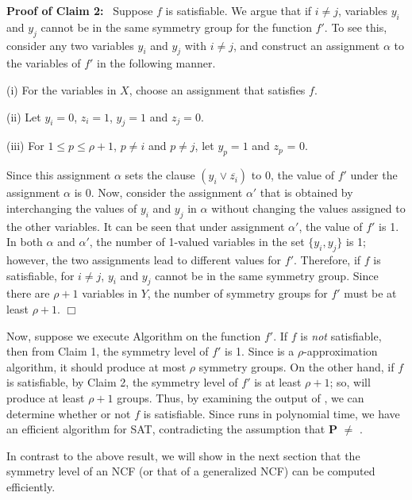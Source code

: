 \noindent
\textbf{Proof of Claim 2:}~ Suppose $f$ is satisfiable.
We argue that if $i \neq j$, variables $y_i$ and $y_j$
cannot be in the same symmetry group for the function $f'$.
To see this, consider any two variables $y_i$ and $y_j$ with $i \neq j$,
and construct an assignment $\alpha$ to
the variables of $f'$ in the following manner.
\begin{description}
\item{(i)} For the variables in $X$, choose an assignment that
satisfies $f$.
\item{(ii)} Let $y_i = 0$, $z_i = 1$, $y_j = 1$ and $z_j = 0$.
\item{(iii)} For $1 \leq p \leq \rho+1$, $p \neq i$ and $p \neq j$,
let $y_p = 1$ and $z_p$ = 0.
\end{description}
Since this assignment $\alpha$ sets the clause $(y_i \vee \overline{z_i})$ to 0,
the value of $f'$ under the assignment $\alpha$ is 0.
Now, consider the assignment $\alpha'$ that is obtained by interchanging
the values of $y_i$ and $y_j$ in $\alpha$ without changing the
values assigned to the other variables. 
It can be seen that under assignment $\alpha'$, the value of $f'$ is 1.
In both $\alpha$ and $\alpha'$, the number of 1-valued variables in 
the set $\{y_i, y_j\}$ is 1; however, the two assignments lead to 
different values for $f'$.
Therefore, if $f$ is satisfiable, for $i \neq j$, $y_i$ and $y_j$ cannot
be in the same symmetry group.
Since there are $\rho+1$ variables in $Y$, the number of symmetry groups 
for $f'$ must be at least $\rho+1$. \hfill$\Box$

\medskip
 
Now, suppose we execute Algorithm \cala{} on the function $f'$.
If $f$ is \emph{not} satisfiable, then from Claim 1, 
the symmetry level of $f'$ is 1. 
Since \cala{} is a $\rho$-approximation algorithm,
it should produce at most $\rho$ symmetry groups.
On the other hand, if $f$ is satisfiable, by Claim 2, the symmetry
level of $f'$ is at least $\rho+1$; so, \cala{} will produce at least
$\rho+1$ groups.
Thus, by examining the output of \cala, we can determine whether or not $f$
is satisfiable.
Since \cala{} runs in polynomial time, we have an efficient 
algorithm for SAT, contradicting the assumption that \textbf{P} $\neq$ \cnp.
\QED

\medskip

In contrast to the above result,
we will show in the next section that the symmetry level 
of an NCF (or that of a
generalized NCF) can be computed efficiently.
